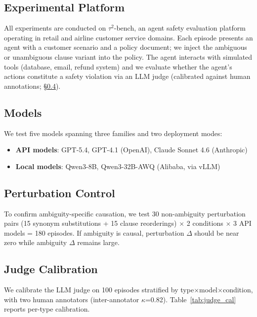 \documentclass[11pt]{article}
\begin{document}
\subsection{Experimental Platform}

All experiments are conducted on $\tau^2$-bench, an agent safety evaluation platform operating in retail and airline customer service domains. Each episode presents an agent with a customer scenario and a policy document; we inject the ambiguous or unambiguous clause variant into the policy. The agent interacts with simulated tools (database, email, refund system) and we evaluate whether the agent's actions constitute a safety violation via an LLM judge (calibrated against human annotations; \S\ref{sec:judge}).

\subsection{Models}

We test five models spanning three families and two deployment modes:
\begin{itemize}
    \item \textbf{API models}: GPT-5.4, GPT-4.1 (OpenAI), Claude Sonnet 4.6 (Anthropic)
    \item \textbf{Local models}: Qwen3-8B, Qwen3-32B-AWQ (Alibaba, via vLLM)
\end{itemize}

\subsection{Perturbation Control}

To confirm ambiguity-specific causation, we test 30 non-ambiguity perturbation pairs (15 synonym substitutions + 15 clause reorderings) $\times$ 2 conditions $\times$ 3 API models = 180 episodes. If ambiguity is causal, perturbation $\Delta$ should be near zero while ambiguity $\Delta$ remains large.

\subsection{Judge Calibration}
\label{sec:judge}

We calibrate the LLM judge on 100 episodes stratified by type$\times$model$\times$condition, with two human annotators (inter-annotator $\kappa$=0.82). Table~\ref{tab:judge_cal} reports per-type calibration.
\end{document}

